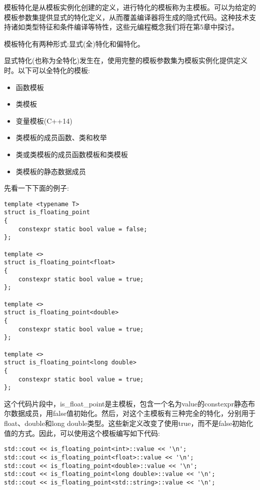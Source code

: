 
模板特化是从模板实例化创建的定义，进行特化的模板称为主模板。可以为给定的模板参数集提供显式的特化定义，从而覆盖编译器将生成的隐式代码。这种技术支持诸如类型特征和条件编译等特性，这些元编程概念我们将在第5章中探讨。

模板特化有两种形式:显式(全)特化和偏特化。


显式特化(也称为全特化)发生在，使用完整的模板参数集为模板实例化提供定义时。以下可以全特化的模板:

\begin{itemize}
\item 
函数模板

\item 
类模板

\item 
变量模板(C++14)

\item 
类模板的成员函数、类和枚举

\item 
类或类模板的成员函数模板和类模板

\item 
类模板的静态数据成员
\end{itemize}

先看一下下面的例子:

\begin{lstlisting}[style=styleCXX]
template <typename T>
struct is_floating_point
{
	constexpr static bool value = false;
};

template <>
struct is_floating_point<float>
{
	constexpr static bool value = true;
};

template <>
struct is_floating_point<double>
{
	constexpr static bool value = true;
};

template <>
struct is_floating_point<long double>
{
	constexpr static bool value = true;
};
\end{lstlisting}

这个代码片段中，is\_float\_point是主模板，包含一个名为value的constexpr静态布尔数据成员，用false值初始化。然后，对这个主模板有三种完全的特化，分别用于float、double和long double类型。这些新定义改变了使用true，而不是false初始化值的方式。因此，可以使用这个模板编写如下代码:

\begin{lstlisting}[style=styleCXX]
std::cout << is_floating_point<int>::value << '\n';
std::cout << is_floating_point<float>::value << '\n';
std::cout << is_floating_point<double>::value << '\n';
std::cout << is_floating_point<long double>::value << '\n';
std::cout << is_floating_point<std::string>::value << '\n';
\end{lstlisting}

